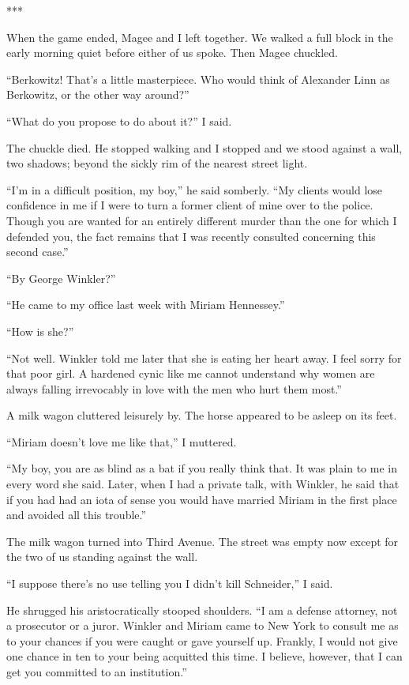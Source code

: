 {***

When the game ended, Magee and I left together. We walked a full block in the early morning quiet before either of us spoke. Then Magee chuckled.

“Berkowitz! That’s a little masterpiece. Who would think of Alexander Linn as Berkowitz, or the other way around?”

“What do you propose to do about it?” I said.

The chuckle died. He stopped walking and I stopped and we stood against a wall, two shadows; beyond the sickly rim of the nearest street light.

“I’m in a difficult position, my boy,” he said somberly. “My clients would lose confidence in me if I were to turn a former client of mine over to the police. Though you are wanted for an entirely different murder than the one for which I defended you, the fact remains that I was recently consulted concerning this second case.”

“By George Winkler?”

“He came to my office last week with Miriam Hennessey.”

“How is she?”

“Not well. Winkler told me later that she is eating her heart away. I feel sorry for that poor girl. A hardened cynic like me cannot understand why women are always falling irrevocably in love with the men who hurt them most.”

A milk wagon cluttered leisurely by. The horse appeared to be asleep on its feet.

“Miriam doesn’t love me like that,” I muttered.

“My boy, you are as blind as a bat if you really think that. It was plain to me in every word she said. Later, when I had a private talk, with Winkler, he said that if you had had an iota of sense you would have married Miriam in the first place and avoided all this trouble.”

The milk wagon turned into Third Avenue. The street was empty now except for the two of us standing against the wall.

“I suppose there’s no use telling you I didn’t kill Schneider,” I said.

He shrugged his aristocratically stooped shoulders. “I am a defense attorney, not a prosecutor or a juror. Winkler and Miriam came to New York to consult me as to your chances if you were caught or gave yourself up. Frankly, I would not give one chance in ten to your being acquitted this time. I believe, however, that I can get you committed to an institution.”

}
